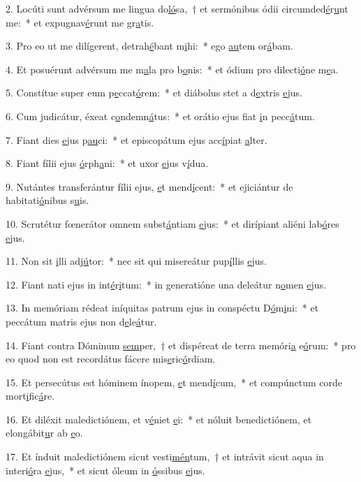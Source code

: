 2. Locúti sunt advérsum me lingua do\uline{ló}sa,~† et sermónibus ódii circumded\uline{é}r\uline{u}nt me:~* et expugnav\uline{é}runt me gr\uline{a}tis.\par 
3. Pro eo ut me dilígerent, detrah\uline{é}bant m\uline{i}hi:~* ego \uline{au}tem or\uline{á}bam.\par 
4. Et posuérunt advérsum me m\uline{a}la pro b\uline{o}nis:~* et ódium pro dilecti\uline{ó}ne m\uline{e}a.\par 
5. Constítue super eum p\uline{e}ccat\uline{ó}rem:~* et diábolus stet a d\uline{e}xtris \uline{e}jus.\par 
6. Cum judicátur, éxeat c\uline{o}ndemn\uline{á}tus:~* et orátio ejus fiat \uline{i}n pecc\uline{á}tum.\par 
7. Fiant dies \uline{e}jus p\uline{au}ci:~* et episcopátum ejus acc\uline{í}piat \uline{a}lter.\par 
8. Fiant fílii ejus \uline{ó}rph\uline{a}ni:~* et uxor \uline{e}jus v\uline{í}dua.\par 
9. Nutántes transferántur fílii ejus, \uline{e}t mend\uline{í}cent:~* et ejiciántur de habitati\uline{ó}nibus s\uline{u}is.\par 
10. Scrutétur fœnerátor omnem subst\uline{á}ntiam \uline{e}jus:~* et dirípiant aliéni lab\uline{ó}res \uline{e}jus.\par 
11. Non sit \uline{i}lli adj\uline{ú}tor:~* nec sit qui misereátur pup\uline{í}llis \uline{e}jus.\par 
12. Fiant nati ejus in int\uline{é}r\uline{i}tum:~* in generatióne una deleátur n\uline{o}men \uline{e}jus.\par 
13. In memóriam rédeat iníquitas patrum ejus in conspéctu D\uline{ó}m\uline{i}ni:~* et peccátum matris ejus non d\uline{e}le\uline{á}tur.\par 
14. Fiant contra Dóminum \uline{sem}per,~† et dispéreat de terra memóri\uline{a} e\uline{ó}rum:~* pro eo quod non est recordátus fácere mis\uline{e}ric\uline{ó}rdiam.\par 
15. Et persecútus est hóminem ínopem, \uline{e}t mend\uline{í}cum,~* et compúnctum corde mort\uline{i}fic\uline{á}re.\par 
16. Et diléxit maledictiónem, et v\uline{é}niet \uline{e}i:~* et nóluit benedictiónem, et elongábit\uline{u}r ab \uline{e}o.\par 
17. Et índuit maledictiónem sicut vesti\uline{mén}tum,~† et intrávit sicut aqua in interi\uline{ó}ra \uline{e}jus,~* et sicut óleum in \uline{ó}ssibus \uline{e}jus.\par 
